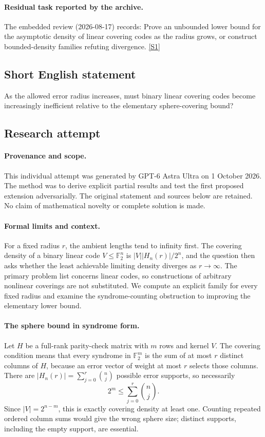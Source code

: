 \documentclass[11pt,a4paper]{article}
\newcommand{\F}{\mathbb{F}}
\newcommand{\sref}[2]{\hyperlink{source:#1:#2}{[S#2]}}
\begin{document}
\paragraph{Residual task reported by the archive.}

The embedded review (2026-08-17) records: Prove an unbounded lower bound for the asymptotic density of linear covering codes as the radius grows, or construct bounded-density families refuting divergence. \sref{statement}{1}

\subsection{Short English statement}

As the allowed error radius increases, must binary linear covering codes become increasingly inefficient relative to the elementary sphere-covering bound?

\subsection{Research attempt}

\paragraph{Provenance and scope.}
This individual attempt was generated by GPT-6 Astra Ultra on 1 October 2026. The method was to derive explicit partial results and test the first proposed extension adversarially. The original statement and sources below are retained. No claim of mathematical novelty or complete solution is made.

\paragraph{Formal limits and context.}
For a fixed radius $r$, the ambient lengths tend to infinity first. The covering density of a binary linear code $V\leq\F_2^n$ is $|V||H_n(r)|/2^n$, and the question then asks whether the least achievable limiting density diverges as $r\to\infty$. The primary problem list concerns linear codes, so constructions of arbitrary nonlinear coverings are not substituted. We compute an explicit family for every fixed radius and examine the syndrome-counting obstruction to improving the elementary lower bound.

\paragraph{The sphere bound in syndrome form.}
Let $H$ be a full-rank parity-check matrix with $m$ rows and kernel $V$. The covering condition means that every syndrome in $\F_2^m$ is the sum of at most $r$ distinct columns of $H$, because an error vector of weight at most $r$ selects those columns. There are $|H_n(r)|=\sum_{j=0}^r\binom nj$ possible error supports, so necessarily
\[
 2^m\leq\sum_{j=0}^r\binom nj.
\]
Since $|V|=2^{n-m}$, this is exactly covering density at least one. Counting repeated ordered column sums would give the wrong sphere size; distinct supports, including the empty support, are essential.
\end{document}
